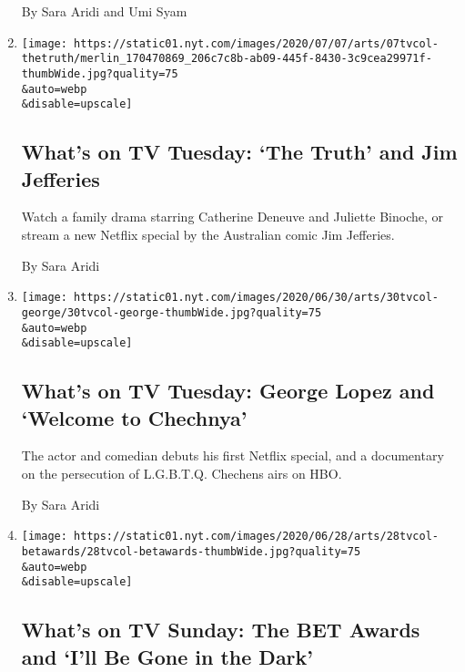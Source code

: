 \begin{enumerate}
  By Sara Aridi and Umi Syam
\item
  \href{/2020/07/07/arts/television/whats-on-tv-tuesday-the-truth-and-jim-jefferies.html}{}

  \texttt{[image: https://static01.nyt.com/images/2020/07/07/arts/07tvcol-thetruth/merlin\_170470869\_206c7c8b-ab09-445f-8430-3c9cea29971f-thumbWide.jpg?quality=75\\\&auto=webp\\\&disable=upscale]}

  \hypertarget{whats-on-tv-tuesday-the-truth-and-jim-jefferies}{%
  \subsection{What's on TV Tuesday: `The Truth' and Jim
  Jefferies}\label{whats-on-tv-tuesday-the-truth-and-jim-jefferies}}

  Watch a family drama starring Catherine Deneuve and Juliette Binoche,
  or stream a new Netflix special by the Australian comic Jim Jefferies.

  By Sara Aridi
\item
  \href{/2020/06/30/arts/television/whats-on-tv-tuesday-george-lopez-and-welcome-to-chechnya.html}{}

  \texttt{[image: https://static01.nyt.com/images/2020/06/30/arts/30tvcol-george/30tvcol-george-thumbWide.jpg?quality=75\\\&auto=webp\\\&disable=upscale]}

  \hypertarget{whats-on-tv-tuesday-george-lopez-and-welcome-to-chechnya}{%
  \subsection{What's on TV Tuesday: George Lopez and `Welcome to
  Chechnya'}\label{whats-on-tv-tuesday-george-lopez-and-welcome-to-chechnya}}

  The actor and comedian debuts his first Netflix special, and a
  documentary on the persecution of L.G.B.T.Q. Chechens airs on HBO.

  By Sara Aridi
\item
  \href{/2020/06/28/arts/television/whats-on-tv-sunday-the-bet-awards-and-ill-be-gone-in-the-dark.html}{}

  \texttt{[image: https://static01.nyt.com/images/2020/06/28/arts/28tvcol-betawards/28tvcol-betawards-thumbWide.jpg?quality=75\\\&auto=webp\\\&disable=upscale]}

  \hypertarget{whats-on-tv-sunday-the-bet-awards-and-ill-be-gone-in-the-dark}{%
  \subsection{What's on TV Sunday: The BET Awards and `I'll Be Gone in
  the
  Dark'}\label{whats-on-tv-sunday-the-bet-awards-and-ill-be-gone-in-the-dark}}


\end{enumerate}
